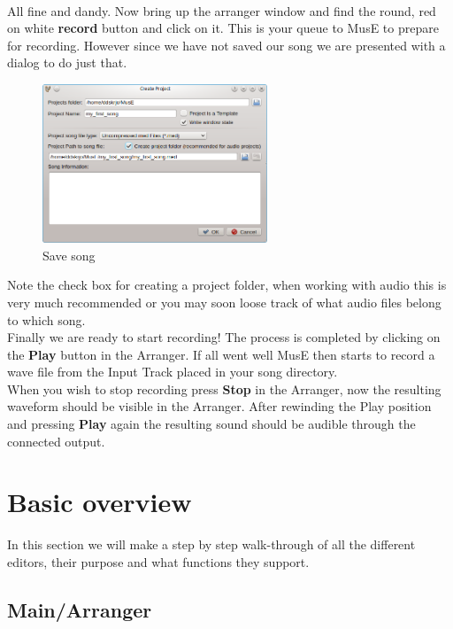 \documentclass[a4paper]{report}
\begin{document}
\\
All fine and dandy. Now bring up the arranger window and find the round, red on
white  \textbf{record} button and click on it. This is your queue to MusE to
prepare for recording. However since we have not saved our song we are presented
with a dialog to do just that.\\
\begin{figure}[htp]
\centering \includegraphics[width=0.6\textwidth]{pics/project_my_first_song} 
\caption{Save song}
\label{fig:Save song}
\end{figure}
Note the check box for creating a project folder, when working with audio this
is very much recommended or you may soon loose track of what audio files belong
to which song.\\
Finally we are ready to start recording! The process is completed by clicking
on the \textbf{Play} button in the Arranger. If all went well MusE then starts
to record a wave file from the Input Track placed in your song directory.\\
When you wish to stop recording press \textbf{Stop} in the Arranger, now the 
resulting waveform should be visible in the Arranger. After rewinding the Play 
position and pressing \textbf{Play} again the resulting sound should be audible
through the connected output.


\section{Basic overview}
In this section we will make a step by step walk-through of all the
different editors, their purpose and what functions they support.

\subsection{Main/Arranger}
\end{document}

